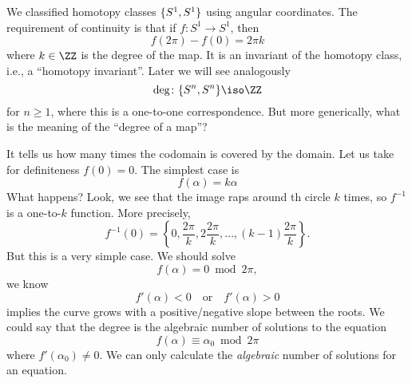 
We classified homotopy classes $\homotopyClass(S^1,S^1)$ using
angular coordinates. The requirement of continuity is that if
$f\colon S^1\to S^1$, then 
\begin{equation}
f(2\pi)-f(0)=2\pi k
\end{equation}
where $k\in\ZZ$ is the degree of the map. It is an invariant of
the homotopy class, i.e., a ``homotopy invariant''.
Later we will see analogously
\begin{equation}
\deg\colon\homotopyClass(S^n,S^n)\iso\ZZ
\end{equation}
for $n\geq1$, where this is a one-to-one correspondence.
But more generically, what is the meaning of the ``degree of a
map''?

It tells us how many times the codomain is covered by the
domain. Let us take for definiteness $f(0)=0$. The simplest case
is
\begin{equation}
f(\alpha)=k\alpha
\end{equation}
What happens? Look, we see that the image raps around th circle
$k$ times, so $f^{-1}$ is a one-to-$k$ function. More precisely,
\begin{equation}
f^{-1}(0)=\left\{0,\frac{2\pi}{k},2\frac{2\pi}{k},\dots,(k-1)\frac{2\pi}{k}\right\}.
\end{equation}
But this is a very simple case. We should solve
\begin{equation}
f(\alpha)=0\bmod2\pi,
\end{equation}
we know
\begin{equation}
f'(\alpha)<0\quad\mbox{or}\quad f'(\alpha)>0
\end{equation}
implies the curve grows with a positive/negative slope between
the roots. We could say that the degree is the algebraic number
of solutions to the equation
\begin{equation}
f(\alpha)\equiv\alpha_0\bmod2\pi
\end{equation}
where $f'(\alpha_0)\not=0$. We can only calculate the
\emph{algebraic} number of solutions for an equation.

